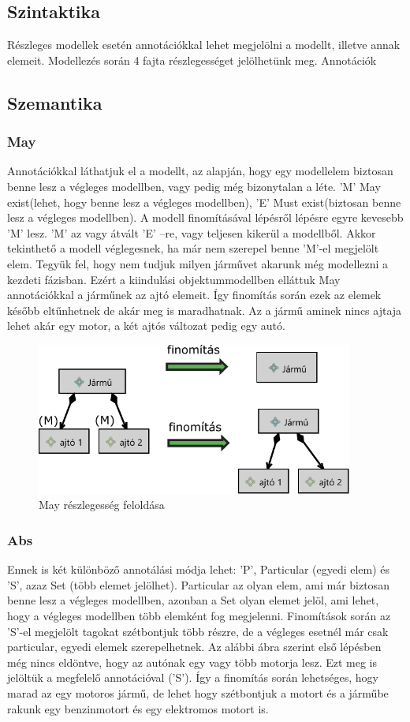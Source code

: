 \subsection{Szintaktika}
Részleges modellek esetén annotációkkal lehet megjelölni a modellt, illetve annak elemeit. Modellezés során 4 fajta részlegességet jelölhetünk meg. 
Annotációk
\subsection{Szemantika}
\subsubsection{May}
Annotációkkal láthatjuk el a modellt, az alapján, hogy egy modellelem biztosan benne lesz a végleges modellben, vagy pedig még bizonytalan a léte. ’M’ May exist(lehet, hogy benne lesz a végleges modellben), ’E’ Must exist(biztosan benne lesz a végleges modellben). A modell finomításával lépésről lépésre egyre kevesebb ’M’ lesz. ’M’ az vagy átvált ’E’ –re, vagy teljesen kikerül a modellből. Akkor tekinthető a modell véglegesnek, ha már nem szerepel benne ’M’-el megjelölt elem.
Tegyük fel, hogy nem tudjuk milyen járművet akarunk még modellezni a kezdeti fázisban. Ezért a kiindulási objektummodellben elláttuk May annotációkkal a járműnek az ajtó elemeit. Így finomítás során ezek az elemek később eltűnhetnek de akár meg is maradhatnak. Az a jármű aminek nincs ajtaja lehet akár egy motor, a két ajtós változat pedig egy autó.

\begin{figure}[!ht]
	\centering
	\includegraphics[height=50mm]{figures/may.pdf}
	\caption{May részlegesség feloldása} 
\end{figure}

\subsubsection{Abs}
Ennek is két különböző annotálási módja lehet: ’P’, Particular (egyedi elem) és ’S’, azaz Set (több elemet jelölhet). Particular az olyan elem, ami már biztosan benne lesz a végleges modellben, azonban a Set olyan elemet jelöl, ami lehet, hogy a végleges modellben több elemként fog megjelenni. Finomítások során az ’S’-el megjelölt
tagokat szétbontjuk több részre, de a végleges esetnél már csak particular, egyedi elemek szerepelhetnek.
Az alábbi ábra szerint első lépésben még nincs eldöntve, hogy az autónak egy vagy több motorja lesz. Ezt meg is jelöltük a megfelelő annotációval ('S'). Így a finomítás során lehetséges, hogy marad az egy motoros jármű, de lehet hogy szétbontjuk a motort és a járműbe rakunk egy benzinmotort és egy elektromos motort is.

